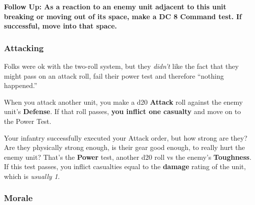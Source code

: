 \documentclass[letterpaper,twocolumn,openany,nodeprecatedcode]{dndbook}
\begin{document}
\textbf{Follow Up: As a reaction to an enemy unit adjacent to this unit breaking or moving out of its space, make a DC 8 Command test. If successful, move into that space.}




\subsubsection{Attacking}

\begin{DndReadAloud}
Folks were ok with the two-roll system, but they \textit{didn’t} like the fact that they might pass on an attack roll, fail their power test and therefore “nothing happened.”
\end{DndReadAloud}

When you attack another unit, you make a d20 \textbf{Attack} roll against the enemy unit’s \textbf{Defense}. If that roll passes, \textbf{you inflict one casualty} and move on to the Power Test.

Your infantry successfully executed your Attack order, but how strong are they? Are they physically strong enough, is their gear good enough, to really hurt the enemy unit? That’s the \textbf{Power} test, another d20 roll vs the enemy’s \textbf{Toughness}. If this test passes, you inflict casualties equal to the \textbf{damage} rating of the unit, which is \textit{usually 1}.

\subsubsection{Morale}
\end{document}
